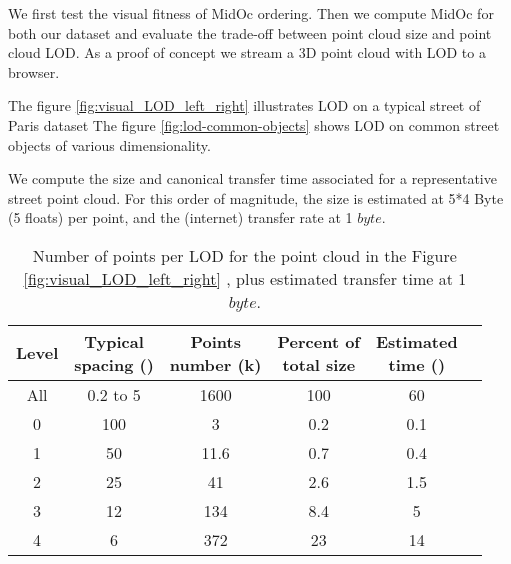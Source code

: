 		
		We first test the visual fitness of MidOc ordering.
		Then we compute MidOc for both our dataset and evaluate the trade-off between point cloud size and point cloud LOD. 
		As a proof of concept we stream a 3D point cloud with LOD to a browser.
		
		The figure \ref{fig:visual_LOD_left_right} illustrates LOD on a typical street of Paris dataset
		The figure \ref{fig:lod-common-objects} shows LOD on common street objects of various dimensionality.
			  
		We compute the size and canonical transfer time associated for a representative street point cloud.
		For this order of magnitude, the size is estimated at 5*4 Byte (5 floats) per point, and the (internet) transfer rate at 1 \mega $byte$\per \second.
		
		\begin{table}[ht]
			\centering
			\caption{Number of points per LOD for the point cloud in the Figure \ref{fig:visual_LOD_left_right}
				, plus estimated transfer time at 1 \mega $byte$\per \second.}
			\label{tab:lod-size-time}
			\scriptsize 
			\begin{tabular}{cccccc}
				\bf{Level} & \shortstack{\bf{Typical} \\ \bf{spacing (\centi \meter)}} & \shortstack{ \bf{Points} \\ \bf{number (k)}} & \shortstack{\bf{Percent of} \\ \bf{total size}} & \shortstack{\bf{Estimated} \\ \bf{time (\second)}}   \\
				\hline All & 0.2 to 5  & 1600 & 100 & 60 \\ 
				\hline 0 & 100 & 3 & 0.2 & 0.1 \\ 
				\hline 1 & 50 & 11.6 & 0.7 & 0.4 \\ 
				\hline 2 & 25 & 41 & 2.6 & 1.5 \\ 
				\hline 3 & 12 & 134 & 8.4 & 5 \\ 
				\hline 4 & 6 & 372 & 23 & 14 \\    
			\end{tabular} 
		\end{table}
			 
